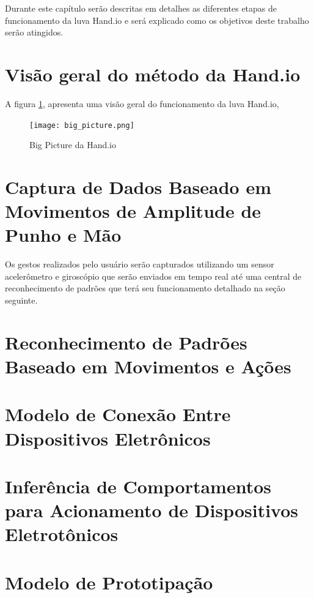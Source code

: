 Durante este capítulo serão descritas em detalhes as diferentes etapas de funcionamento da luva Hand.io e será explicado como os objetivos deste trabalho serão atingidos.

\section{Visão geral do método da Hand.io}





A figura \ref{fig:bigpicture}, apresenta uma visão geral do funcionamento da luva Hand.io, 


\begin{figure}[ht]
    \centering
	\texttt{[image: big\_picture.png]}
	\caption{Big Picture da Hand.io}
	\label{fig:bigpicture}
\end{figure}






\section{Captura de Dados Baseado em Movimentos de Amplitude de Punho e Mão}

Os gestos realizados pelo usuário serão capturados utilizando um sensor acelerômetro e giroscópio que serão enviados em tempo real até uma central de reconhecimento de padrões que terá seu funcionamento detalhado na seção seguinte. 



\section{Reconhecimento de Padrões Baseado em Movimentos e Ações}



\section{Modelo de Conexão Entre Dispositivos Eletrônicos}

\section{Inferência de Comportamentos para Acionamento de Dispositivos Eletrotônicos}

\section{Modelo de Prototipação}

